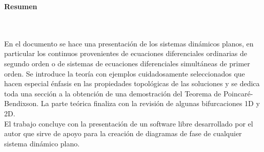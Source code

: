 \newpage{\pagestyle{empty}\cleardoublepage}


%
\newpage
\textbf{\LARGE Resumen}
\\\\
En el documento se hace una presentación de los sistemas dinámicos planos, en particular los continuos provenientes de ecuaciones diferenciales ordinarias de segundo orden o de sistemas de ecuaciones diferenciales simultáneas de primer orden. Se introduce la teoría con ejemplos cuidadosamente seleccionados que hacen especial énfasis en las propiedades topológicas de las soluciones y se dedica toda una sección a la obtención de una demostración del Teorema de Poincaré-Bendixson. La parte teórica finaliza con la revisión de algunas bifurcaciones 1D y 2D.\\
El trabajo concluye con la presentación de un software libre desarrollado por el autor que sirve de apoyo para la creación de diagramas de fase de cualquier sistema dinámico plano.
\\


